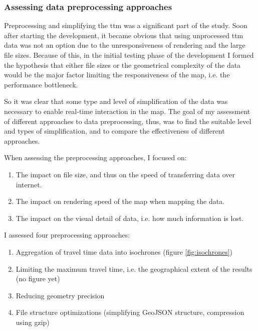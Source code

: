 


\subsubsection{Assessing data preprocessing approaches}
Preprocessing and simplifying the \acrshort{ttm} was a significant part of the study.
Soon after starting the development,
it became obvious that using unprocessed \acrshort{ttm} data was not an option
due to the unresponsiveness of rendering and the large file sizes.
Because of this, in the initial testing phase of the development
I formed the hypothesis that either file sizes
or the geometrical complexity of the data would be
the major factor limiting the responsiveness of the map,
i.e. the performance bottleneck.

So it was clear that some type and level of simplification of the 
data was necessary to enable real-time interaction in the map.
The goal of my assessment of different approaches to data preprocessing, thus,
was to find the suitable level and types of simplification,
and to compare the effectiveness of different approaches.

When assessing the preprocessing approaches, I focused on:
\begin{enumerate}
	\item The impact on file size, and thus on the speed of transferring data over internet.
	\item The impact on rendering speed of the map when mapping the data.
	\item The impact on the visual detail of data,
	i.e. how much information is lost.
\end{enumerate}

I assessed four preprocessing approaches:
\begin{enumerate}
	\item Aggregation of travel time data into isochrones (figure \ref{fig:isochrones})
	\item Limiting the maximum travel time, i.e. the geographical extent of the results (no figure yet)
	\item Reducing geometry precision
	\item File structure optimizations (simplifying GeoJSON structure, compression using gzip)
\end{enumerate}

